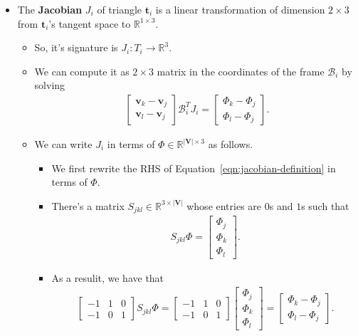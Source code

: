 \documentclass[10pt]{article}
\newcommand{\ve}[1]{\mathbf{#1}}
\newcommand{\ra}{\rightarrow}
\newcommand{\mcal}[1]{\mathcal{#1}}
\newcommand{\Real}{\mathbb{R}}
\begin{document}
\begin{itemize}
    \item The {\bf Jacobian} $J_i$ of triangle $\ve{t}_i$ is a linear transformation of dimension $2 \times 3$ from $\ve{t}_i$'s tangent space to $\Real^{1 \times 3}$.
    \begin{itemize}
        \item So, it's signature is $J_i: T_i \ra \Real^{3}$.
        \item We can compute it as  $2 \times 3$ matrix in the coordinates of the frame $\mcal{B}_i$ by solving
        \begin{align}
            \begin{bmatrix}
                \ve{v}_k - \ve{v}_j \\ 
                \ve{v}_l - \ve{v}_j
            \end{bmatrix}
            \mcal{B}_i^T
            J_i
            = \begin{bmatrix}
                \Phi_k - \Phi_j \\ \Phi_l - \Phi_j
            \end{bmatrix}. \label{eqn:jacobian-definition}
        \end{align}
        \item We can write $J_i$ in terms of $\Phi \in \Real^{|\ve{V}| \times 3}$ as follows.
        \begin{itemize}
            \item We first rewrite the RHS of Equation~\eqref{eqn:jacobian-definition} in terms of $\Phi$.
            \item There's a matrix $S_{jkl} \in \Real^{3 \times |\ve{V}|}$ whose entries are $0$s and $1$s such that
            \begin{align*}
                S_{jkl} \Phi = \begin{bmatrix} \Phi_j \\ \Phi_k \\ \Phi_l \end{bmatrix}.
            \end{align*}
            \item As a resulit, we have that
            \begin{align*}
                \begin{bmatrix} -1 & 1 & 0 \\ -1 & 0 & 1 \end{bmatrix}  S_{jkl} \Phi  
                = \begin{bmatrix} -1 & 1 & 0 \\ -1 & 0 & 1 \end{bmatrix} \begin{bmatrix} \Phi_j \\ \Phi_k \\ \Phi_l \end{bmatrix}
                = \begin{bmatrix} \Phi_k - \Phi_j \\ \Phi_l - \Phi_j \end{bmatrix}.
            \end{align*}
            

\end{itemize}
\end{itemize}
\end{itemize}
\end{document}
